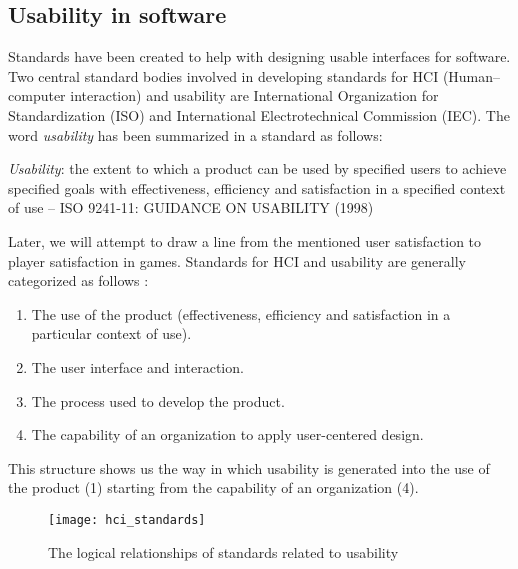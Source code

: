 \subsection{Usability in software}
Standards have been created to help with designing usable interfaces for software. Two central standard bodies involved in developing standards for HCI (Human--computer interaction) and usability are International Organization for Standardization (ISO) and International Electrotechnical Commission (IEC). The word \textit{usability} has been summarized in a standard as follows:

\begin{displayquote}

\textit{Usability}: the extent to which a product can be used by specified users to achieve specified goals with effectiveness, efficiency and satisfaction in a specified context of use -- ISO 9241-11: GUIDANCE ON USABILITY (1998) \cite{ISO1998}

\end{displayquote}

Later, we will attempt to draw a line from the mentioned user satisfaction to player satisfaction in games. Standards for HCI and usability are generally categorized as follows \cite{Bevan2006}:
\begin{enumerate}
	\item The use of the product (effectiveness, efficiency and satisfaction in a particular context of use).
	\item The user interface and interaction.
	\item The process used to develop the product.
	\item The capability of an organization to apply user-centered design.
\end{enumerate}

This structure shows us the way in which usability is generated into the use of the product (1) starting from the capability of an organization (4). 

\begin{figure}[h]
	\centering
	\texttt{[image: hci\_standards]}
	\caption{The logical relationships of standards related to usability \cite{Bevan2006}}
\end{figure}

